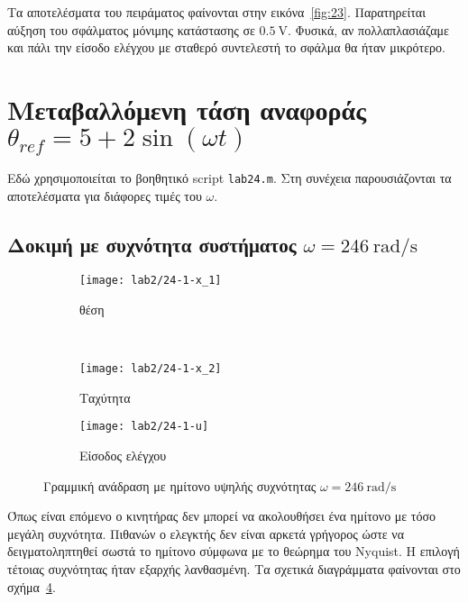 Τα αποτελέσματα του πειράματος φαίνονται στην εικόνα~\ref{fig:23}.
Παρατηρείται αύξηση του σφάλματος μόνιμης κατάστασης σε $\SI{0.5}{\volt}$.
Φυσικά, αν πολλαπλασιάζαμε και πάλι την είσοδο ελέγχου με σταθερό συντελεστή το σφάλμα θα ήταν μικρότερο.

\section[Μεταβαλλόμενη τάση αναφοράς]{Μεταβαλλόμενη τάση αναφοράς $\theta_{ref} = 5 + 2 \sin{\left(\omega t\right)}$}
Εδώ χρησιμοποιείται το βοηθητικό script \texttt{lab24.m}.
Στη συνέχεια παρουσιάζονται τα αποτελέσματα για διάφορες τιμές του $\omega$.
\subsection[Δοκιμή με συχνότητα συστήματος]{Δοκιμή με συχνότητα συστήματος $\omega = \SI{246}{\radian / \second}$}
\begin{figure}[htbp]
  \centering
  \begin{subfigure}[t]{\linewidth}
    \texttt{[image: lab2/24-1-x\_1]}
    \caption{θέση}
    \label{fig:24-1-x_1}
  \end{subfigure}\\
  \begin{subfigure}[t]{0.45\linewidth}
    \texttt{[image: lab2/24-1-x\_2]}
    \caption{Ταχύτητα}
    \label{fig:24-1-x_2}
  \end{subfigure}\hfill
  \begin{subfigure}[t]{0.45\linewidth}
    \texttt{[image: lab2/24-1-u]}
    \caption{Είσοδος ελέγχου}
    \label{fig:24-1-u}
  \end{subfigure}
  \caption[Γραμμική ανάδραση με ημίτονο υψηλής συχνότητας]{Γραμμική ανάδραση με ημίτονο υψηλής συχνότητας $\omega = \SI{246}{\radian / \second}$}
  \label{fig:24-1}
\end{figure}
Όπως είναι επόμενο ο κινητήρας δεν μπορεί να ακολουθήσει ένα ημίτονο με τόσο μεγάλη συχνότητα.
Πιθανών ο ελεγκτής δεν είναι αρκετά γρήγορος ώστε να δειγματοληπτηθεί σωστά το ημίτονο σύμφωνα με το θεώρημα του
Nyquist.
Η επιλογή τέτοιας συχνότητας ήταν εξαρχής λανθασμένη.
Τα σχετικά διαγράμματα φαίνονται στο σχήμα~\ref{fig:24-1}.


